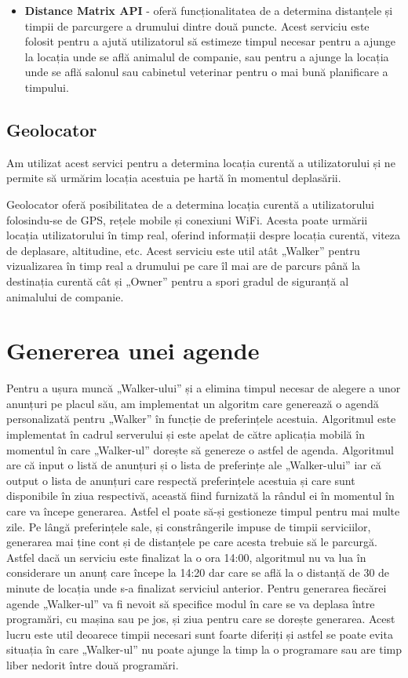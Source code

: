 \begin{itemize}
    \item \textbf{Distance Matrix API} - oferă funcționalitatea de a determina distanțele și timpii de parcurgere a drumului dintre două puncte. Acest serviciu este folosit pentru a ajută utilizatorul să estimeze timpul necesar pentru a ajunge la locația unde se află animalul de companie, sau pentru a ajunge la locația unde se află salonul sau cabinetul veterinar pentru o mai bună planificare a timpului.
\end{itemize} 

\subsection{Geolocator}

Am utilizat acest servici pentru a determina locația curentă a utilizatorului și ne permite să urmărim locația acestuia pe hartă în momentul deplasării. 

Geolocator oferă posibilitatea de a determina locația curentă a utilizatorului \newline folosindu-se de GPS, rețele mobile și conexiuni WiFi. Acesta poate urmării locația utilizatorului în timp real, oferind informații despre locația curentă, viteza de deplasare, altitudine, etc. Acest serviciu este util atât „Walker” pentru vizualizarea în timp real a drumului pe care îl mai are de parcurs până la destinația curentă cât și „Owner” pentru a spori gradul de siguranță al animalului de companie.

\section{Genererea unei agende}

Pentru a ușura muncă „Walker-ului” și a elimina timpul necesar de alegere a unor anunțuri pe placul său, am implementat un algoritm care generează o agendă personalizată pentru „Walker” în funcție de preferințele acestuia. Algoritmul este implementat în cadrul serverului și este apelat de către aplicația mobilă în momentul în care „Walker-ul” dorește să genereze o astfel de agenda. Algoritmul are că input o listă de anunțuri și o lista de preferințe ale „Walker-ului” iar că output o lista de anunțuri care respectă preferințele acestuia și care sunt disponibile în ziua respectivă, această fiind furnizată la rândul ei în momentul în care va începe generarea. Astfel el poate să-și gestioneze timpul pentru mai multe zile. Pe lângă preferințele sale, și constrângerile impuse de timpii serviciilor, generarea mai ține cont și de distanțele pe care acesta trebuie să le parcurgă. Astfel dacă un serviciu este finalizat la o ora 14:00, algoritmul nu va lua în considerare un anunț care începe la 14:20 dar care se află la o distanță de 30 de minute de locația unde s-a finalizat serviciul anterior. Pentru generarea fiecărei agende „Walker-ul” va fi nevoit să specifice modul în care se va deplasa între programări, cu mașina sau pe jos, și ziua pentru care se dorește generarea. Acest lucru este util deoarece timpii necesari sunt foarte diferiți și astfel se poate evita situația în care „Walker-ul” nu poate ajunge la timp la o programare sau are timp liber nedorit între două programări.

